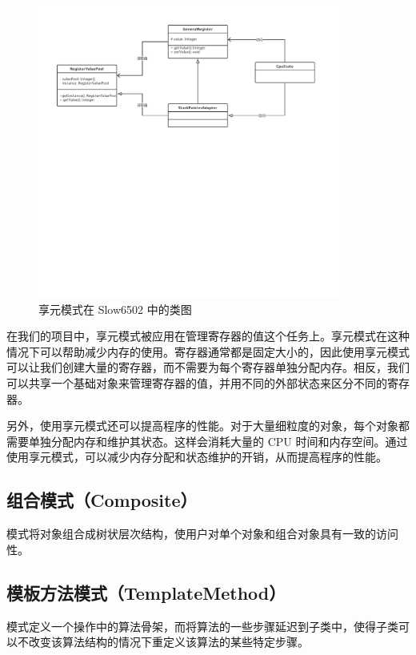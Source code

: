\documentclass[cn,black,12pt,normal]{elegantnote}
\begin{document}
\begin{figure}[H]
  \centering
  \includegraphics[width=0.9\textwidth]{figures/享元模式.pdf}
  \caption{享元模式在 Slow6502 中的类图}
\end{figure}

在我们的项目中，享元模式被应用在管理寄存器的值这个任务上。享元模式在这种情况下可以帮助减少内存的使用。寄存器通常都是固定大小的，因此使用享元模式可以让我们创建大量的寄存器，而不需要为每个寄存器单独分配内存。相反，我们可以共享一个基础对象来管理寄存器的值，并用不同的外部状态来区分不同的寄存器。

另外，使用享元模式还可以提高程序的性能。对于大量细粒度的对象，每个对象都需要单独分配内存和维护其状态。这样会消耗大量的 CPU 时间和内存空间。通过使用享元模式，可以减少内存分配和状态维护的开销，从而提高程序的性能。


\subsection{组合模式（Composite）}

模式将对象组合成树状层次结构，使用户对单个对象和组合对象具有一致的访问性。

\subsection{模板方法模式（TemplateMethod）}

模式定义一个操作中的算法骨架，而将算法的一些步骤延迟到子类中，使得子类可以不改变该算法结构的情况下重定义该算法的某些特定步骤。
\end{document}
